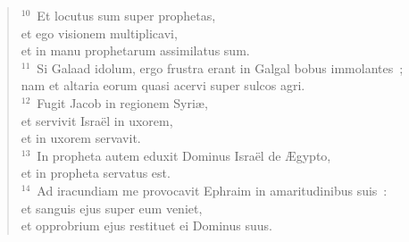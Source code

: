 \begin{verse}
${}^{10}$~Et locutus sum super prophetas,\\ et ego visionem multiplicavi,\\ et in manu prophetarum assimilatus sum.\\
${}^{11}$~Si Galaad idolum, ergo frustra erant in Galgal bobus immolantes~;\\ nam et altaria eorum quasi acervi super sulcos agri.\\
${}^{12}$~Fugit Jacob in regionem Syri\ae ,\\ et servivit Isra\"el in uxorem,\\ et in uxorem servavit.\\
${}^{13}$~In propheta autem eduxit Dominus Isra\"el de \AE gypto,\\ et in propheta servatus est.\\
${}^{14}$~Ad iracundiam me provocavit Ephraim in amaritudinibus suis~:\\ et sanguis ejus super eum veniet,\\ et opprobrium ejus restituet ei Dominus suus.\end{verse}


